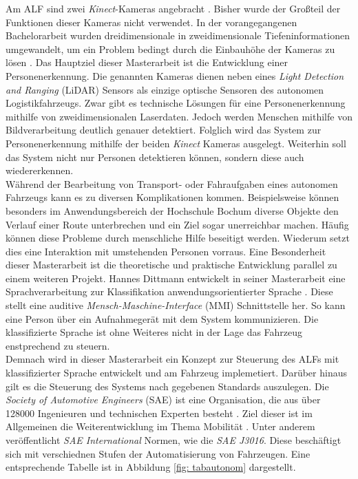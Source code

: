 		Am ALF sind zwei \textit{Kinect}-Kameras angebracht \cite{Bachelorarbeit}. Bisher wurde der Großteil der Funktionen dieser Kameras nicht verwendet. In der vorangegangenen Bachelorarbeit wurden dreidimensionale in zweidimensionale Tiefeninformationen umgewandelt, um ein Problem bedingt durch die Einbauhöhe der Kameras zu lösen \cite{Bachelorarbeit}. Das Hauptziel dieser Masterarbeit ist die Entwicklung einer Personenerkennung. Die genannten Kameras dienen neben eines \textit{Light Detection and Ranging} (LiDAR) Sensors als einzige optische Sensoren des autonomen Logistikfahrzeugs. Zwar gibt es technische Lösungen für eine Personenerkennung mithilfe von zweidimensionalen Laserdaten. Jedoch werden Menschen mithilfe von Bildverarbeitung deutlich genauer detektiert. Folglich wird das System zur Personenerkennung mithilfe der beiden \textit{Kinect} Kameras ausgelegt. Weiterhin soll das System nicht nur Personen detektieren können, sondern diese auch wiedererkennen. \\
		
		Während der Bearbeitung von Transport- oder Fahraufgaben eines autonomen Fahrzeugs kann es zu diversen Komplikationen kommen. Beispielsweise können besonders im Anwendungsbereich der Hochschule Bochum diverse Objekte den Verlauf einer Route unterbrechen und ein Ziel sogar unerreichbar machen. Häufig können diese Probleme durch menschliche Hilfe beseitigt werden. Wiederum setzt dies eine Interaktion mit umstehenden Personen vorraus. Eine Besonderheit dieser Masterarbeit ist die theoretische und praktische Entwicklung parallel zu einem weiteren Projekt. Hannes Dittmann entwickelt in seiner Masterarbeit eine Sprachverarbeitung zur Klassifikation anwendungsorientierter Sprache \cite{Dittmann}. Diese stellt eine auditive \textit{Mensch-Maschine-Interface} (MMI) Schnittstelle her. So kann eine Person über ein Aufnahmegerät mit dem System kommunizieren. Die klassifizierte Sprache ist ohne Weiteres nicht in der Lage das Fahrzeug enstprechend zu steuern.\\
		
		Demnach wird in dieser Masterarbeit ein Konzept zur Steuerung des ALFs mit klassifizierter Sprache entwickelt und am Fahrzeug implemetiert. Darüber hinaus gilt es die Steuerung des Systems nach gegebenen Standards auszulegen. Die \textit{Society of Automotive Engineers} (SAE) ist eine Organisation, die aus über 128000 Ingenieuren und technischen Experten besteht \cite{saeorg}. Ziel dieser ist im Allgemeinen die Weiterentwicklung im Thema Mobilität \cite{saeorg}. Unter anderem veröffentlicht \textit{SAE International} Normen, wie die \textit{SAE J3016}. Diese beschäftigt sich mit verschiednen Stufen der Automatisierung von Fahrzeugen. Eine entsprechende Tabelle ist in Abbildung \ref{fig: tabautonom} dargestellt.\\
		
